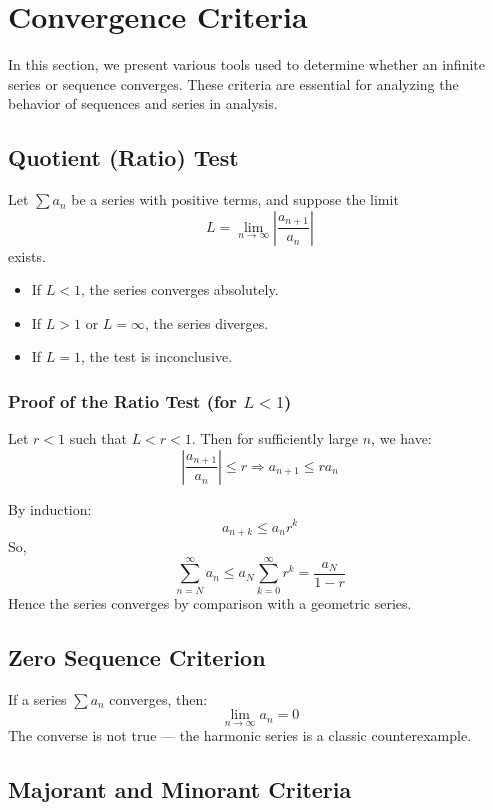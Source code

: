 \section{Convergence Criteria}

In this section, we present various tools used to determine whether an infinite series or sequence converges. These criteria are essential for analyzing the behavior of sequences and series in analysis.

\subsection{Quotient (Ratio) Test}

Let \(\sum a_n\) be a series with positive terms, and suppose the limit
\[
L = \lim_{n \to \infty} \left| \frac{a_{n+1}}{a_n} \right|
\]
exists.

\begin{itemize}[label=\(-\)]
\item If \(L < 1\), the series converges absolutely.
\item If \(L > 1\) or \(L = \infty\), the series diverges.
\item If \(L = 1\), the test is inconclusive.
\end{itemize}

\subsubsection*{Proof of the Ratio Test (for \(L < 1\))}

Let \(r < 1\) such that \(L < r < 1\). Then for sufficiently large \(n\), we have:
\[
\left| \frac{a_{n+1}}{a_n} \right| \le r \Rightarrow a_{n+1} \le r a_n
\]

By induction:
\[
a_{n+k} \le a_n r^k
\]
So,
\[
\sum_{n=N}^\infty a_n \le a_N \sum_{k=0}^\infty r^k = \frac{a_N}{1 - r}
\]
Hence the series converges by comparison with a geometric series.

\subsection{Zero Sequence Criterion}

If a series \(\sum a_n\) converges, then:
\[
\lim_{n \to \infty} a_n = 0
\]
The converse is not true — the harmonic series is a classic counterexample.

\subsection{Majorant and Minorant Criteria}

